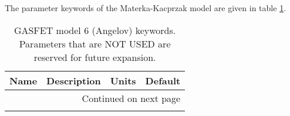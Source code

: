 The parameter keywords of the Materka-Kacprzak model are given in table
\ref{btable6}.


\begin{longtable}[h]{|p{0.6in}|p{3.5in}|p{0.6in}|p{0.6in}|}
\caption[GASFET model 6 (Angelov) keywords.]{GASFET model 6 (Angelov)
keywords.
Parameters that are {\sc NOT USED} are reserved for future
expansion.
         \label{btable6}}\\

\hline
\multicolumn{1}{|c}{\bf Name} &
\multicolumn{1}{|c}{\parbox{2.77in}{\bf Description}}  &
\multicolumn{1}{|c}{\bf Units} &
\multicolumn{1}{|c|}{\bf Default}\\ \hline
\endhead

\hline \multicolumn{4}{|r|}{{Continued on next page}} \\ \hline
\endfoot

\hline \hline
\endlastfoot


\end{longtable}

